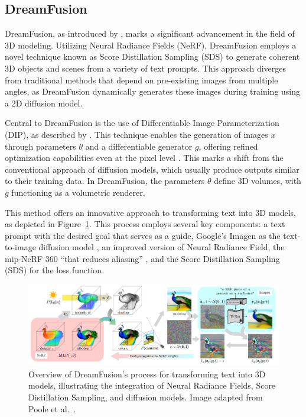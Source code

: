 \subsection{DreamFusion}\label{dreamfusion}

DreamFusion, as introduced by \citeauthor{pooleDreamfusion}, marks a significant advancement in the field of 3D modeling. Utilizing Neural Radiance Fields (NeRF), DreamFusion employs a novel technique known as Score Distillation Sampling (SDS) to generate coherent 3D objects and scenes from a variety of text prompts. This approach diverges from traditional methods that depend on pre-existing images from multiple angles, as DreamFusion dynamically generates these images during training using a 2D diffusion model.

Central to DreamFusion is the use of Differentiable Image Parameterization (DIP), as described by \citep{mordvintsevDIP}. This technique enables the generation of images \( x \) through parameters \( \theta \) and a differentiable generator \( g \), offering refined optimization capabilities even at the pixel level \citep{pooleDreamfusion}. This marks a shift from the conventional approach of diffusion models, which usually produce outputs similar to their training data. In DreamFusion, the parameters \( \theta \) define 3D volumes, with \( g \) functioning as a volumetric renderer. 

This method offers an innovative approach to transforming text into 3D models, as depicted in Figure~\ref{fig:figureDreamfusion}. This process employs several key components: a text prompt with the desired goal that serves as a guide, Google's Imagen as the text-to-image diffusion model \citep{saharia2022imagen}, an improved version of Neural Radiance Field, the mip-NeRF 360 \citep{barron2022mipnerf} ``that reduces aliasing'' \citep{pooleDreamfusion}, and the Score Distillation Sampling (SDS) for the loss function.

\begin{figure}[ht]
  \centering
    \includegraphics[width=1\columnwidth]{figures/models/Dreamfusion.png}
    \caption{Overview of DreamFusion's process for transforming text into 3D models, illustrating the integration of Neural Radiance Fields, Score Distillation Sampling, and diffusion models. Image adapted from Poole et al.~\citep{pooleDreamfusion}.}\label{fig:figureDreamfusion}
\end{figure}

